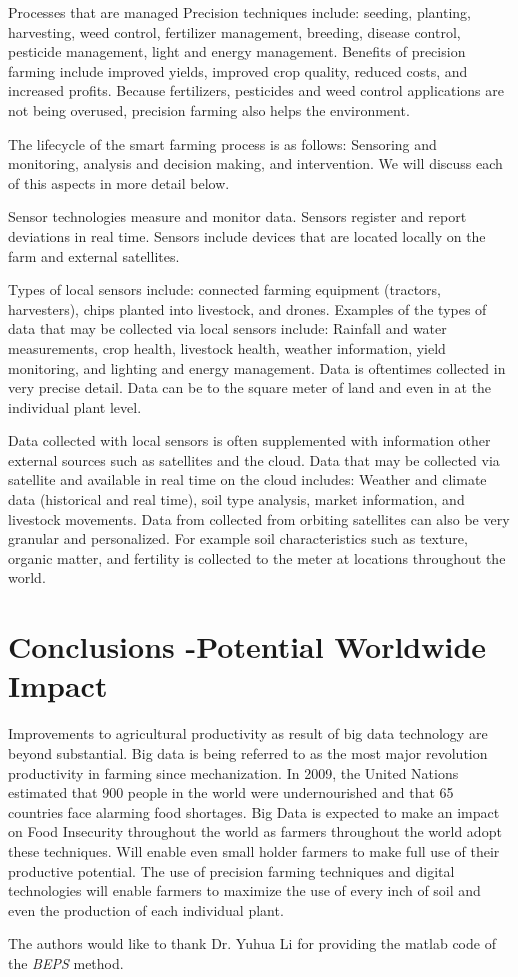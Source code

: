 \documentclass[sigconf]{acmart}
\begin{document}
Processes that are managed Precision techniques include: seeding, planting, harvesting, weed control, fertilizer management, breeding, disease control, pesticide management, light and energy management. Benefits of precision farming include improved yields, improved crop quality, reduced costs, and increased profits.  Because fertilizers, pesticides and weed control applications are not being overused, precision farming also helps the environment. 


The lifecycle of the smart farming process is as follows: Sensoring and monitoring, analysis and decision making, and intervention.  We will discuss each of this aspects in more detail below.

Sensor technologies measure and monitor data.  Sensors register and report deviations in real time. Sensors include devices that are located locally on the farm and external satellites. 

Types of local sensors include: connected farming equipment (tractors, harvesters), chips planted into livestock, and drones. Examples of the types of data that may be collected via local sensors include: Rainfall and water measurements, crop health, livestock health, weather information, yield monitoring, and lighting and energy management. Data is oftentimes collected in very precise detail. Data can be to the square meter of land and even in at the individual plant level. 

Data collected with local sensors is often supplemented with information other external sources such as satellites and the cloud. Data that may be collected via satellite and available in real time on the cloud includes: Weather and climate data (historical and real time), soil type analysis, market information, and livestock movements. Data from collected from orbiting satellites can also be very granular and personalized. For example soil characteristics such as texture, organic matter, and fertility is collected to the meter at locations throughout the world. 


\section{Conclusions -Potential Worldwide Impact}

Improvements to agricultural productivity as result of big data technology are beyond substantial. Big data is being referred to as the most major revolution productivity in farming since mechanization.  In 2009, the United Nations estimated that 900 people in the world were undernourished and that 65 countries face alarming food shortages. Big Data is expected to make an impact on Food Insecurity throughout the world as farmers throughout the world adopt these techniques. Will enable even small holder farmers to make full use of their productive potential. The use of precision farming techniques and digital technologies will enable farmers to maximize the use of every inch of soil and even the production of each individual plant.


\begin{acks}

  The authors would like to thank Dr. Yuhua Li for providing the
  matlab code of the \textit{BEPS} method.

\end{acks}


 
\end{document}
